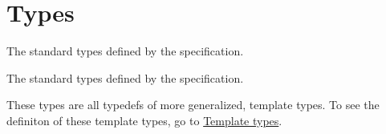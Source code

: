 \hypertarget{group__core__types}{}\section{Types}
\label{group__core__types}


The standard types defined by the specification.  


The standard types defined by the specification. 

These types are all typedefs of more generalized, template types. To see the definiton of these template types, go to \hyperlink{group__core__template}{Template types}. 